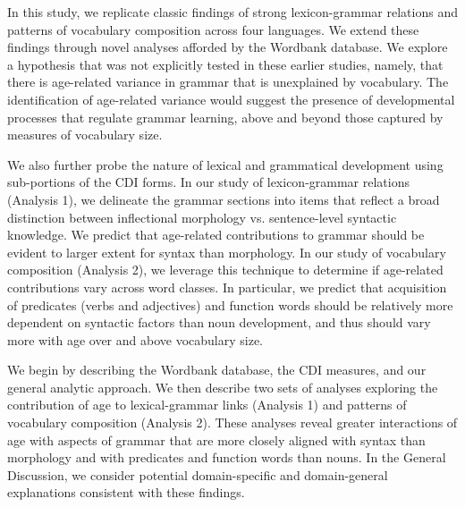 \documentclass[10pt,letterpaper]{article}
\begin{document}

In this study, we replicate classic findings of strong lexicon-grammar relations and patterns of vocabulary composition across four languages. We extend these findings through novel analyses afforded by the Wordbank database. We explore a hypothesis that was not explicitly tested in these earlier studies, namely, that there is age-related variance in grammar that is unexplained by vocabulary. The identification of age-related variance would suggest the presence of developmental processes that regulate grammar learning, above and beyond those captured by measures of vocabulary size.

We also further probe the nature of lexical and grammatical development using sub-portions of the CDI forms. In our study of lexicon-grammar relations (Analysis 1), we delineate the grammar sections into items that reflect a broad distinction between inflectional morphology vs. sentence-level syntactic knowledge. We predict that age-related contributions to grammar should be evident to larger extent for syntax than morphology. In our study of vocabulary composition (Analysis 2), we leverage this technique to determine if age-related contributions vary across word classes. In particular, we predict that acquisition of predicates (verbs and adjectives) and function words should be relatively more dependent on syntactic factors than noun development, and thus should vary more with age over and above vocabulary size.


We begin by describing the Wordbank database, the CDI measures, and our general analytic approach. We then describe two sets of analyses exploring the contribution of age to lexical-grammar links (Analysis 1) and patterns of vocabulary composition (Analysis 2). These analyses reveal greater interactions of age with aspects of grammar that are more closely aligned with syntax than morphology and with predicates and function words than nouns. In the General Discussion, we consider potential domain-specific and domain-general explanations consistent with these findings.
\end{document}

